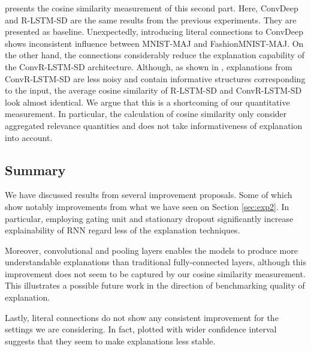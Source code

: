 \addfigure{\ref{fig:rel_dist_convdeep_trans_exp}} presents the cosine similarity measurement of this second part. Here, ConvDeep and R-LSTM-SD are the same results from the previous experiments. They are presented as baseline. Unexpectedly, introducing literal connections to ConvDeep shows inconsistent influence between MNIST-MAJ and FashionMNIST-MAJ. On the other hand, the connections considerably reduce the explanation capability of the ConvR-LSTM-SD architecture. 
 Although,  as shown in \addfigure{\ref{fig:heatmap_msc_convrlstm_pos_rel}}, explanations from ConvR-LSTM-SD are less noisy and contain informative structures corresponding to the input, the average cosine similarity of R-LSTM-SD and ConvR-LSTM-SD look almost identical. We argue that this is a shortcoming of our quantitative measurement. In particular, the calculation of cosine similarity only consider aggregated relevance quantities and  does not take informativeness of explanation into account.
 

\clearpage

\subsection{Summary}
We have discussed results from several improvement proposals. Some of which show notably improvements from what we have seen on Section \ref{sec:exp2}. In particular, employing gating unit and stationary dropout significantly increase explainability of RNN regard less of the explanation techniques.

Moreover, convolutional and pooling layers enables the models to produce more understandable  explanations than traditional fully-connected layers, although this improvement does not seem to be  captured by  our cosine similarity measurement. This illustrates  a possible future work in the direction of benchmarking quality of explanation.

Lastly, literal connections do not show any consistent improvement for the settings we are considering. In fact, plotted with wider confidence interval suggests that they seem to make explanations less stable.
